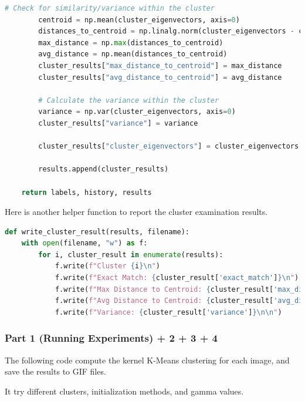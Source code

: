 \documentclass{homework}
\begin{document}
\begin{lstlisting}[language=Python]
        # Check for similarity/variance within the cluster
        centroid = np.mean(cluster_eigenvectors, axis=0)
        distances_to_centroid = np.linalg.norm(cluster_eigenvectors - centroid, axis=1)
        max_distance = np.max(distances_to_centroid)
        avg_distance = np.mean(distances_to_centroid)
        cluster_results["max_distance_to_centroid"] = max_distance
        cluster_results["avg_distance_to_centroid"] = avg_distance

        # Calculate the variance within the cluster
        variance = np.var(cluster_eigenvectors, axis=0)
        cluster_results["variance"] = variance

        cluster_results["cluster_eigenvectors"] = cluster_eigenvectors

        results.append(cluster_results)

    return labels, history, results
\end{lstlisting}

Here is another helper function to report the cluster examination results.

\begin{lstlisting}[language=Python]
def write_cluster_result(results, filename):
    with open(filename, "w") as f:
        for i, cluster_result in enumerate(results):
            f.write(f"Cluster {i}\n")
            f.write(f"Exact Match: {cluster_result['exact_match']}\n")
            f.write(f"Max Distance to Centroid: {cluster_result['max_distance_to_centroid']}\n")
            f.write(f"Avg Distance to Centroid: {cluster_result['avg_distance_to_centroid']}\n")
            f.write(f"Variance: {cluster_result['variance']}\n\n")
\end{lstlisting}

\subsubsection{Part 1 (Running Experiments) + 2 + 3 + 4}

The following code compute the kernel K-Means clustering for each image, and save the results to GIF files.

It try different clusters, initialization methods, and gamma values.
\end{document}
